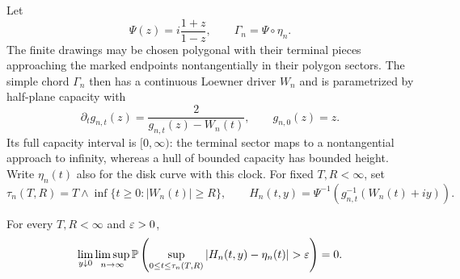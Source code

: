 Let
\[
 \Psi(z)=i\frac{1+z}{1-z},\qquad
 \Gamma_n=\Psi\circ\eta_n.
\]
The finite drawings may be chosen polygonal with their terminal
pieces approaching the marked endpoints nontangentially in their
polygon sectors.  The simple chord $\Gamma_n$ then has a continuous
Loewner driver $W_n$ and is parametrized by half-plane capacity with
\begin{equation}\label{eq:loewner-clock}
 \partial_t g_{n,t}(z)=\frac{2}{g_{n,t}(z)-W_n(t)},
 \qquad g_{n,0}(z)=z.
\end{equation}
Its full capacity interval is $[0,\infty)$: the terminal sector maps
to a nontangential approach to infinity, whereas a hull of bounded
capacity has bounded height.  Write $\eta_n(t)$ also for the disk
curve with this clock.  For fixed $T,R<\infty$, set
\[
 \tau_n(T,R)=T\wedge\inf\{t\ge0:|W_n(t)|\ge R\},\qquad
 H_n(t,y)=\Psi^{-1}\!\left(g_{n,t}^{-1}(W_n(t)+iy)\right).
\]

\begin{proposition}
\label{prop:tip-approximation}
For every $T,R<\infty$ and $\varepsilon>0$,
\begin{equation}\label{eq:tip-approximation}
 \lim_{y\downarrow0}\limsup_{n\to\infty}
 \P\left(\sup_{0\le t\le\tau_n(T,R)}
 |H_n(t,y)-\eta_n(t)|>\eps\right)=0.
\end{equation}
\end{proposition}


